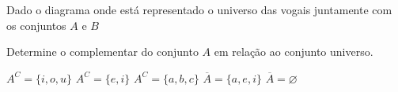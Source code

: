 Dado o diagrama onde está representado o universo das vogais juntamente com os conjuntos $A$ e $B$


\begin{center}
\end{center}
\vspace{-5mm}

Determine o complementar do conjunto $A$ em relação ao conjunto universo.

\noindent\parbox{\linewidth}{

$A^C=\{i,o,u\}$
$A^C=\{e,i\}$
$A^C=\{a,b,c\}$
$\overline{A}=\{a,e,i\}$
$\overline{A}=\varnothing$



}




